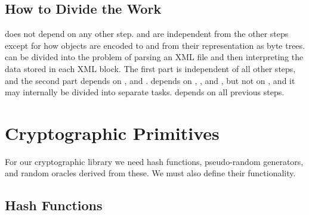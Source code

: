 \documentclass[11pt]{article}
\begin{document}
\subsection{How to Divide the Work}

 does not depend on any other step. 
and  are independent from the other steps except for
how objects are encoded to and from their representation as byte
trees.  can be divided into the problem of parsing an
XML file and then interpreting the data stored in each XML block. The
first part is independent of all other steps, and the second part
depends on ,  and
.  depends on ,
, and , but not on ,
and it may internally be divided into separate tasks. 
depends on all previous steps.




\section{Cryptographic Primitives}\label{sect:primitives}

For our cryptographic library we need hash functions, pseudo-random
generators, and random oracles derived from these. We must also define
their functionality.

\subsection{Hash Functions}\label{sect:hashfunctions}
\end{document}
